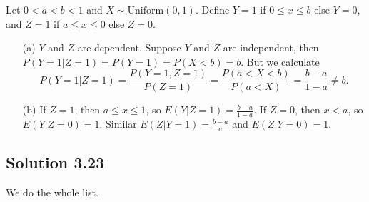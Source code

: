 Let $0 < a < b < 1$ and $X \sim \mathrm{Uniform}(0, 1)$.
Define $Y = 1$ if $0 \leq x \leq b$ else $Y = 0$, and $Z = 1$ if $a \leq x \leq 0$ else $Z = 0$.
\begin{itemize}
    \item[(a)] $Y$ and $Z$ are dependent.
        Suppose $Y$ and $Z$ are independent, then $P(Y=1|Z=1) = P(Y=1) = P(X < b) = b$.
        But we calculate
        \begin{equation*}
            P(Y=1|Z=1) = \frac{P(Y=1, Z=1)}{P(Z=1)}
                = \frac{P(a < X < b)}{P(a < X)}
                = \frac{b - a}{1 - a}
                \neq b.
        \end{equation*}
    \item[(b)] If $Z = 1$, then $a \leq x \leq 1$, so $E(Y|Z=1) = \frac{b - a}{1 - a}$.
        If $Z = 0$, then $x < a$, so $E(Y|Z=0) = 1$.
        Similar $E(Z|Y=1) = \frac{b - a}{a}$ and $E(Z|Y=0) = 1$.
\end{itemize}


\subsection*{Solution 3.23}

We do the whole list.

